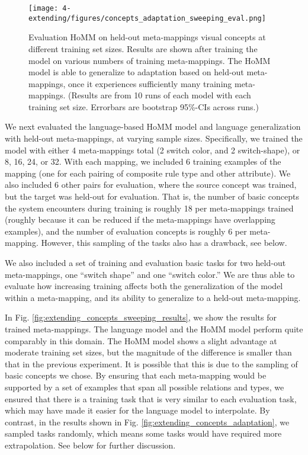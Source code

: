 \begin{figure}[htb]
\centering
\texttt{[image: 4-extending/figures/concepts\_adaptation\_sweeping\_eval.png]}
\caption[Evaluating HoMM on held-out meta-mappings at different training set sizes.]{Evaluation HoMM on held-out meta-mappings visual concepts at different training set sizes. Results are shown after training the model on various numbers of training meta-mappings. The HoMM model is able to generalize to adaptation based on held-out meta-mappings, once it experiences sufficiently many training meta-mappings. (Results are from 10 runs of each model with each training set size. Errorbars are bootstrap 95\%-CIs across runs.)} \label{fig:extending_concepts_sweeping_results_eval}
\end{figure}

We next evaluated the language-based HoMM model and language generalization with held-out meta-mappings, at varying sample sizes. Specifically, we trained the model with either 4 meta-mappings total (2 switch color, and 2 switch-shape), or 8, 16, 24, or 32. With each mapping, we included 6 training examples of the mapping (one for each pairing of composite rule type and other attribute). We also included 6 other pairs for evaluation, where the source concept was trained, but the target was held-out for evaluation. That is, the number of basic concepts the system encounters during training is roughly 18 per meta-mappings trained (roughly because it can be reduced if the meta-mappings have overlapping examples), and the number of evaluation concepts is roughly 6 per meta-mapping. However, this sampling of the tasks also has a drawback, see below. \par
We also included a set of training and evaluation basic tasks for two held-out meta-mappings, one ``switch shape'' and one ``switch color.'' We are thus able to evaluate how increasing training affects both the generalization of the model within a meta-mapping, and its ability to generalize to a held-out meta-mapping. \par

In Fig. \ref{fig:extending_concepts_sweeping_results}, we show the results for trained meta-mappings. The language model and the HoMM model perform quite comparably in this domain. The HoMM model shows a slight advantage at moderate training set sizes, but the magnitude of the difference is smaller than that in the previous experiment. It is possible that this is due to the sampling of basic concepts we chose. By ensuring that each meta-mapping would be supported by a set of examples that span all possible relations and types, we ensured that there is a training task that is very similar to each evaluation task, which may have made it easier for the language model to interpolate. By contrast, in the results shown in Fig. \ref{fig:extending_concepts_adaptation}, we sampled tasks randomly, which means some tasks would have required more extrapolation. See below for further discussion.\par


